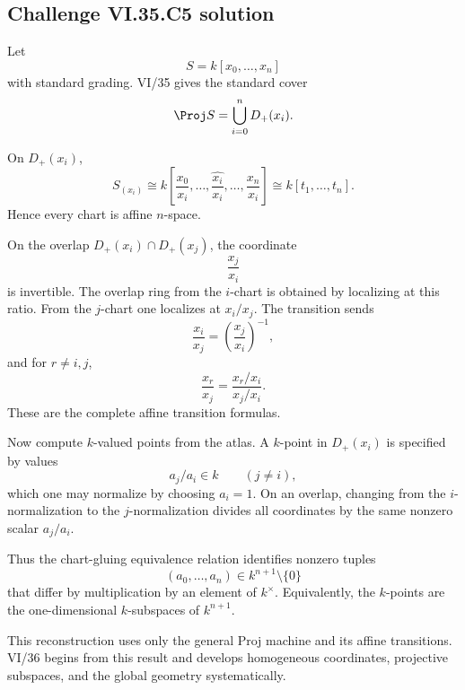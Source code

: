 \subsection*{Challenge VI.35.C5 solution}
\begin{solution}
Let
\[
S=k[x_0,\ldots,x_n]
\]
with standard grading.  VI/35 gives the standard cover
\[
\Proj S=\bigcup_{i=0}^nD_+(x_i).
\]

On \(D_+(x_i)\),
\[
S_{(x_i)}
\cong
k\!\left[
\frac{x_0}{x_i},
\ldots,
\widehat{\frac{x_i}{x_i}},
\ldots,
\frac{x_n}{x_i}
\right]
\cong
k[t_1,\ldots,t_n].
\]
Hence every chart is affine \(n\)-space.

On the overlap \(D_+(x_i)\cap D_+(x_j)\), the coordinate
\[
\frac{x_j}{x_i}
\]
is invertible.  The overlap ring from the \(i\)-chart is obtained by localizing at this ratio.  From the \(j\)-chart
one localizes at \(x_i/x_j\).  The transition sends
\[
\frac{x_i}{x_j}
=
\left(\frac{x_j}{x_i}\right)^{-1},
\]
and for \(r\neq i,j\),
\[
\frac{x_r}{x_j}
=
\frac{x_r/x_i}{x_j/x_i}.
\]
These are the complete affine transition formulas.

Now compute \(k\)-valued points from the atlas.  A \(k\)-point in \(D_+(x_i)\) is specified by values
\[
a_j/a_i\in k
\qquad(j\neq i),
\]
which one may normalize by choosing \(a_i=1\).  On an overlap, changing from the \(i\)-normalization to the
\(j\)-normalization divides all coordinates by the same nonzero scalar \(a_j/a_i\).

Thus the chart-gluing equivalence relation identifies nonzero tuples
\[
(a_0,\ldots,a_n)\in k^{n+1}\setminus\{0\}
\]
that differ by multiplication by an element of \(k^\times\).  Equivalently, the \(k\)-points are the
one-dimensional \(k\)-subspaces of \(k^{n+1}\).

This reconstruction uses only the general Proj machine and its affine transitions.  VI/36 begins from this result
and develops homogeneous coordinates, projective subspaces, and the global geometry systematically.
\end{solution}
